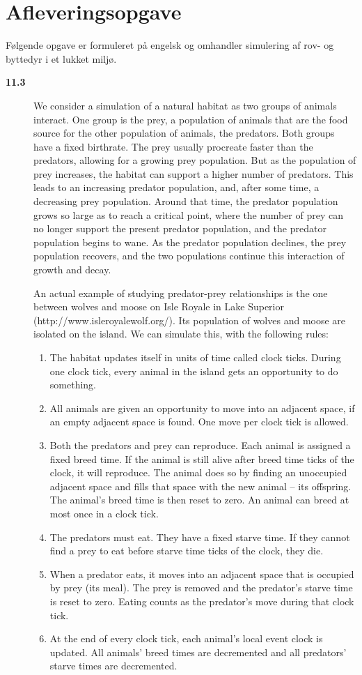 \documentclass[a4paper,12pt]{article}
\begin{document}
\section*{Afleveringsopgave}
Følgende opgave er formuleret på engelsk og omhandler simulering af rov- og byttedyr i et lukket miljø.
\begin{description}
\item[\textbf{11.3}] We consider a simulation of a natural habitat as two groups of animals interact. One group is the prey, a population of animals that are the food source for the other population of animals, the predators. Both groups have a fixed birthrate. The prey usually procreate faster than the predators, allowing for a growing prey population. But as the population of prey increases, the habitat can support a higher number of predators. This leads to an increasing predator population, and, after some time, a decreasing prey population. Around that time, the predator population grows so large as to reach a critical point, where the number of prey can no longer support the present predator population, and the predator population begins to wane. As the predator population declines, the prey population recovers, and the two populations continue this interaction of growth and decay.

  An actual example of studying predator-prey relationships is the one between wolves and moose on Isle Royale in Lake Superior (http://www.isleroyalewolf.org/). Its population of wolves and moose are isolated on the island. We can simulate this, with the following rules:
  \begin{enumerate}
  \item The habitat updates itself in units of time called clock ticks. During one clock tick, every animal in the island gets an opportunity to do something. 
  \item All animals are given an opportunity to move into an adjacent space, if an empty adjacent space is found. One move per clock tick is allowed.
  \item Both the predators and prey can reproduce. Each animal is assigned a fixed breed time. If the animal is still alive after breed time ticks of the clock, it will reproduce. The animal does so by finding an unoccupied adjacent space and fills that space with the new animal – its offspring. The animal’s breed time is then reset to zero. An animal can breed at most once in a clock tick.
  \item The predators must eat. They have a fixed starve time. If they cannot find a prey to eat before starve time ticks of the clock, they die.
  \item When a predator eats, it moves into an adjacent space that is occupied by prey (its meal). The prey is removed and the predator’s starve time is reset to zero. Eating counts as the predator’s move during that clock tick.
  \item At the end of every clock tick, each animal’s local event clock is updated. All animals’ breed times are decremented and all predators’ starve times are decremented.
  \end{enumerate}
\end{description}
\end{document}
